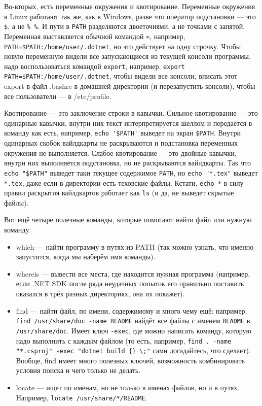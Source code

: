 \documentclass{../../text-style}
\begin{document}
Во-вторых, есть переменные окружения и квотирование. Переменные окружения в Linux работают так же, как в Windows, разве что оператор подстановки --- это \verb|$|, а не \verb|% %|.
И пути в \verb|PATH| разделяются двоеточиями, а не точками с запятой.
Переменная выставляется обычной командой \verb|=|, например, \verb|PATH=$PATH:/home/user/.dotnet|, но это действует на одну строчку.
Чтобы новую переменную видели все запускающиеся из текущей консоли программы, надо воспользоваться командой \verb|export|, например, \verb|export PATH=$PATH:/home/user/.dotnet|, чтобы видели все консоли, вписать этот export в файл .bashrc в домашней директории (и перезапустить консоли), чтобы все пользователи --- в /etc/profile.

Квотирование --- это заключение строки в кавычки.
Сильное квотирование --- это одинарные кавычки, внутри них текст интерпретируется шеллом и передаётся в команду как есть, например, \verb|echo '$PATH'| выведет на экран \verb|$PATH|.
Внутри одинарных скобок вайлдкарты не раскрываются и подстановка переменных окружения не выполняется.
Слабое квотирование --- это двойные кавычки, внутри них выполняется подстановка, но не раскрываются вайлдкарты.
Так что \verb|echo "$PATH"| выведет таки текущее содержимое \verb|PATH|, но \verb|echo "*.tex"| выведет \verb|*.tex|, даже если в директории есть теховские файлы.
Кстати, \verb|echo *| в силу правил раскрытия вайлдкартов работает как \verb|ls| (и да, не выведет скрытые файлы).

Вот ещё четыре полезные команды, которые помогают найти файл или нужную команду.

\begin{itemize}
    \item which --- найти программу в путях из PATH (так можно узнать, что именно запустится, когда мы наберём имя команды).
    \item whereis --- вывести все места, где находится нужная программа (например, если .NET SDK после ряда неудачных попыток его правильно поставить оказался в трёх разных директориях, она их покажет).
    \item find --- найти файл, по имени, содержимому и много чему ещё: например, \verb|find /usr/share/doc -name README| найдёт все файлы с именем \verb|README| в \verb|/usr/share/doc|. 
        Имеет ключ \verb|-exec|, где можно написать команду, которую надо выполнить с каждым файлом (то есть, например, \verb|find . -name "*.csproj" -exec "dotnet build {} \;"| сами догадайтесь, что сделает).
        Вообще, find имеет много полезных ключей, возможность комбинировать условия поиска и чего только не делать.
    \item locate --- ищет по именам, но не только в именах файлов, но и в путях.
        Например, \verb|locate /usr/share/*/README|.
\end{itemize}
\end{document}

